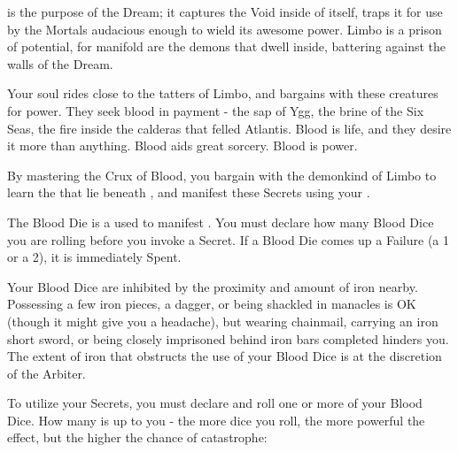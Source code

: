 

 is the purpose of the Dream; it captures the Void inside of itself, traps it for use by the Mortals audacious enough to wield its awesome power. Limbo is a prison of potential, for manifold are the demons that dwell inside, battering against the walls of the Dream. 

Your soul rides close to the tatters of Limbo, and bargains with these creatures for power. They seek blood in payment - the sap of Ygg, the brine of the Six Seas, the fire inside the calderas that felled Atlantis. Blood is life, and they desire it more than anything. Blood aids great sorcery. Blood is power.

By mastering the Crux of Blood, you bargain with the demonkind of Limbo to learn the  that lie beneath , and manifest these Secrets using your .



The Blood Die is a  used to manifest . You must declare how many Blood Dice you are rolling before you invoke a Secret. If a Blood Die comes up a Failure (a 1 or a 2), it is immediately Spent.

Your Blood Dice are inhibited by the proximity and amount of iron nearby. Possessing a few iron pieces, a dagger, or being shackled in manacles is OK (though it might give you a headache), but wearing chainmail, carrying an iron short sword, or being closely imprisoned behind iron bars completed hinders you. The extent of iron that obstructs the use of your Blood Dice is at the discretion of the Arbiter.

\cbreak


To utilize your Secrets, you must declare and roll one or more of your Blood Dice.  How many is up to you - the more dice you roll, the more powerful the effect, but the higher the chance of catastrophe:


